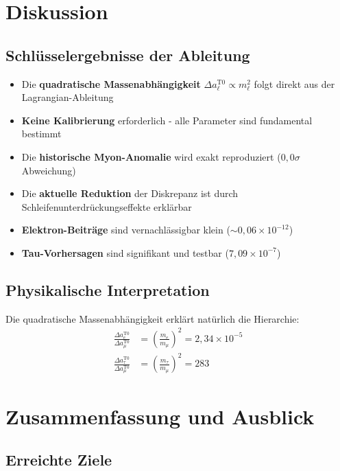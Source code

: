 \documentclass[12pt,a4paper]{article}
\theoremstyle{definition}
\begin{document}
	\section{Diskussion}
	
	\subsection{Schlüsselergebnisse der Ableitung}
	
	\begin{itemize}
		\item Die \textbf{quadratische Massenabhängigkeit} $\Delta a_\ell^{\text{T0}} \propto m_\ell^2$ folgt direkt aus der Lagrangian-Ableitung
		\item \textbf{Keine Kalibrierung} erforderlich - alle Parameter sind fundamental bestimmt
		\item Die \textbf{historische Myon-Anomalie} wird exakt reproduziert ($0,0\sigma$ Abweichung)
		\item Die \textbf{aktuelle Reduktion} der Diskrepanz ist durch Schleifenunterdrückungseffekte erklärbar
		\item \textbf{Elektron-Beiträge} sind vernachlässigbar klein ($\sim 0,06 \times 10^{-12}$)
		\item \textbf{Tau-Vorhersagen} sind signifikant und testbar ($7,09 \times 10^{-7}$)
	\end{itemize}
	
	\subsection{Physikalische Interpretation}
	
	Die quadratische Massenabhängigkeit erklärt natürlich die Hierarchie:
	\begin{align*}
		\frac{\Delta a_e^{\text{T0}}}{\Delta a_\mu^{\text{T0}}} &= \left(\frac{m_e}{m_\mu}\right)^2 = 2,34 \times 10^{-5}\\
		\frac{\Delta a_\tau^{\text{T0}}}{\Delta a_\mu^{\text{T0}}} &= \left(\frac{m_\tau}{m_\mu}\right)^2 = 283
	\end{align*}
	
	\section{Zusammenfassung und Ausblick}
	
	\subsection{Erreichte Ziele}
	
\end{document}
